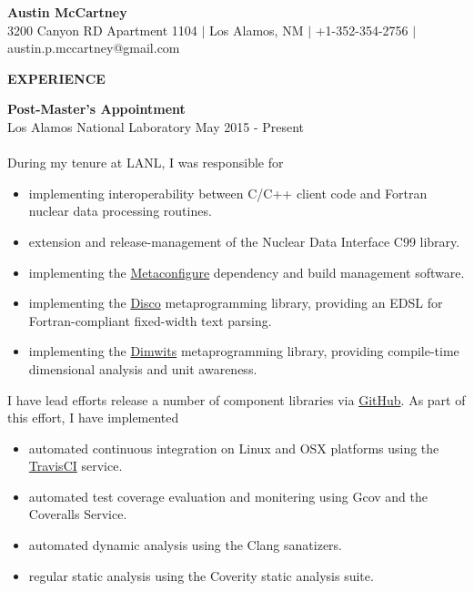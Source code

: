 \documentclass[legalpaper]{article}
\begin{document}
\setlength\multicolsep{0pt}
\pagestyle{empty}

\begin{center}
  {\Large \textbf{Austin McCartney}\\}
  3200 Canyon RD Apartment 1104 $\vert$ Los Alamos, NM $\vert$ +1-352-354-2756 $\vert$ austin.p.mccartney@gmail.com
\end{center}
\begin{center}
  \begin{shaded}
    { \color{white} \textbf{EXPERIENCE}}
  \end{shaded}
\end{center}

\textbf{Post-Master's Appointment}\\
Los Alamos National Laboratory \hfill May 2015 - Present\\
~\\
During my tenure at LANL, I was responsible for
\begin{itemize}[noitemsep, before={\vspace*{-0.5\baselineskip}}]
\item implementing interoperability between C/C++ client code and Fortran nuclear data processing routines.
\item extension and release-management of the Nuclear Data Interface C99 library.
\item implementing the \href{https://github.com/njoy/metaconfigure}{Metaconfigure} dependency and build management software.
\item implementing the \href{https://github.com/njoy/disco}{Disco} metaprogramming library, providing an EDSL for Fortran-compliant fixed-width text parsing.
\item implementing the \href{https://github.com/njoy/DimensionalAnalysis}{Dimwits} metaprogramming library, providing compile-time dimensional analysis and unit awareness.
\end{itemize}

I have lead efforts release a number of component libraries via \href{https://github.com/njoy}{GitHub}. As part of this effort, I have implemented
\medskip
\begin{itemize}[noitemsep, before={\vspace*{-0.5\baselineskip}}]
\item automated continuous integration on Linux and OSX platforms using the \href{https://travis-ci.org/njoy}{TravisCI} service.
\item automated test coverage evaluation and monitering using Gcov and the Coveralls Service.
\item automated dynamic analysis using the Clang sanatizers.
\item regular static analysis using the Coverity static analysis suite.
\end{itemize}
\end{document}
